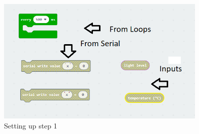 \begin{figure}
    \centering
    \includegraphics[width=10cm]{chapters/ChapterP2-datalog/figures/datalog2.png}
    \caption{Setting up step 1}
    \label{fig:datalogstep1}
\end{figure}


